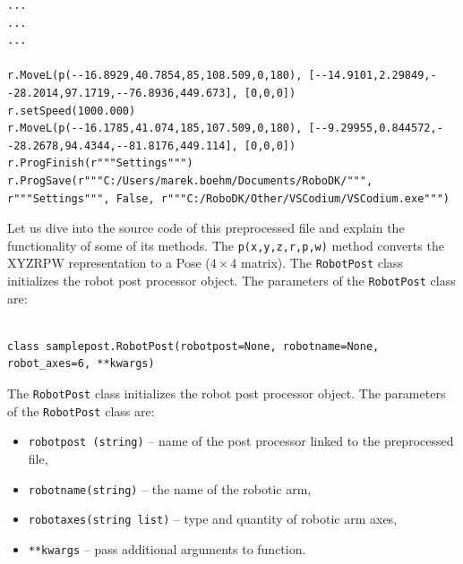 \begin{code}
\begin{verbatim}
...
...
...

r.MoveL(p(--16.8929,40.7854,85,108.509,0,180), [--14.9101,2.29849,--28.2014,97.1719,--76.8936,449.673], [0,0,0])
r.setSpeed(1000.000)
r.MoveL(p(--16.1785,41.074,185,107.509,0,180), [--9.29955,0.844572,--28.2678,94.4344,--81.8176,449.114], [0,0,0])
r.ProgFinish(r"""Settings""")
r.ProgSave(r"""C:/Users/marek.boehm/Documents/RoboDK/""", r"""Settings""", False, r"""C:/RoboDK/Other/VSCodium/VSCodium.exe""")

\end{verbatim}
\label{code:preprocessed_python}
\end{code}



Let us dive into the source code of this preprocessed file and explain the functionality of some of its methods. The \texttt{p(x,y,z,r,p,w)} method converts the XYZRPW representation to a Pose ($ 4 \times 4 $ matrix). The \texttt{RobotPost} class initializes the robot post processor object. The parameters of the \texttt{RobotPost} class are:


\begin{verbatim}

class samplepost.RobotPost(robotpost=None, robotname=None, robot_axes=6, **kwargs)

\end{verbatim}

The \texttt{RobotPost} class initializes the robot post processor object. The parameters of the \texttt{RobotPost} class are:

\begin{itemize}

\item \texttt{robotpost (string)} -- name of the post processor linked to the preprocessed file,

\item \texttt{robotname(string)} -- the name of the robotic arm,

\item \texttt{robotaxes(string list)} -- type and quantity of robotic arm axes,

\item \texttt{**kwargs} -- pass additional arguments to function.

\end{itemize}




